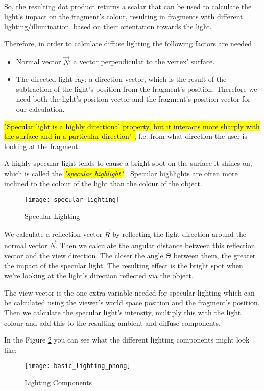 So, the resulting dot product returns a scalar that can be used to calculate the light's impact on the fragment's colour, resulting in fragments with different lighting/illumination, based on their orientation towards the light.

Therefore, in order to calculate diffuse lighting the following factors are needed \cite{lightinglearnopengl}: 
\begin{itemize}
	\item Normal vector $\overrightarrow{N}$: a vector perpendicular to the vertex' surface.
	\item The directed light ray: a direction vector, which is the result of the subtraction of the light's position from the fragment's position. Therefore we need both the light's position vector and the fragment's position vector for our calculation.
\end{itemize}



\hl{"Specular light is a highly directional property, but it interacts more sharply with the surface and in a particular direction" \cite{superbible},} f.e. from what direction the user is looking at the fragment.

A highly specular light tends to cause a bright spot on the surface it shines on, which is called the \emph{\hl{"specular highlight"}} \cite{superbible}. Specular highlights are often more inclined to the colour of the light than the colour of the object.


\begin{figure}[h!]
	\centering
	\texttt{[image: specular\_lighting]}
	\caption{Specular Lighting \cite{lightinglearnopengl}}
	\label{fig:specular-lighting}
\end{figure}


We calculate a reflection vector $\overrightarrow{R}$ by reflecting the light direction around the normal vector $\overrightarrow{N}$. Then we calculate the angular distance between this reflection vector and the view direction. The closer the angle $\Theta$ between them, the greater the impact of the specular light. The resulting effect is the bright spot when we're looking at the light's direction reflected via the object.

The view vector is the one extra variable needed for specular lighting which can be calculated using the viewer's world space position and the fragment's position. 
Then we calculate the specular light's intensity, multiply this with the light colour and add this to the resulting ambient and diffuse components.\cite{lightinglearnopengl}

In the Figure \ref{fig:basic_lighting_phong} you can see what the different lighting components might look like: 

\begin{figure}[h!]
	\centering
	\texttt{[image: basic\_lighting\_phong]}
	\caption{Lighting Components \cite{lightinglearnopengl}}
	\label{fig:basic_lighting_phong}
\end{figure}

